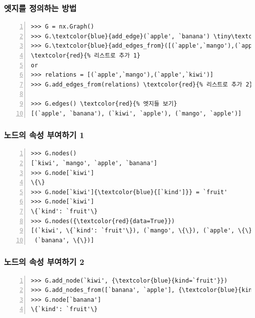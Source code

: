 \documentclass{beamer}
\begin{document}
\begin{frame}[fragile]
\frametitle{엣지를 정의하는 방법}
\begin{block}{}
\begin{Verbatim}[numbers=left,commandchars=\\\{\}]
>>> G = nx.Graph()
>>> G.\textcolor{blue}{add_edge}(`apple', `banana') \tiny\textcolor{red}{% `apple'과 `banana'의 관계(엣지) 추가}
>>> G.\textcolor{blue}{add_edges_from}([(`apple',`mango'),(`apple',`kiwi')])
\textcolor{red}{% 리스트로 추가 1}
or
>>> relations = [(`apple',`mango'),(`apple',`kiwi')]
>>> G.add_edges_from(relations) \textcolor{red}{% 리스트로 추가 2}

>>> G.edges() \textcolor{red}{% 엣지들 보기}
[(`apple', `banana'), (`kiwi', `apple'), (`mango', `apple')]
\end{Verbatim}
\end{block}
\end{frame}

\begin{frame}[fragile]
\frametitle{노드의 속성 부여하기 1}
\begin{block}{}
\begin{Verbatim}[numbers=left,commandchars=\\\{\}]
>>> G.nodes()
[`kiwi', `mango', `apple', `banana']
>>> G.node[`kiwi']
\{\}
>>> G.node[`kiwi']{\textcolor{blue}{[`kind']}} = `fruit'
>>> G.node[`kiwi']
\{`kind': `fruit'\}
>>> G.nodes({\textcolor{red}{data=True}})
[(`kiwi', \{`kind': `fruit'\}), (`mango', \{\}), (`apple', \{\}),
 (`banana', \{\})]
\end{Verbatim}
\end{block}
\end{frame}

\begin{frame}[fragile]
\frametitle{노드의 속성 부여하기 2}
\begin{block}{}
\begin{Verbatim}[numbers=left,commandchars=\\\{\}]
>>> G.add_node(`kiwi', {\textcolor{blue}{kind=`fruit'}})
>>> G.add_nodes_from([`banana', `apple'], {\textcolor{blue}{kind=`fruit'}})
>>> G.node[`banana']
\{`kind': `fruit'\}
\end{Verbatim}
\end{block}
\end{frame}
\end{document}
